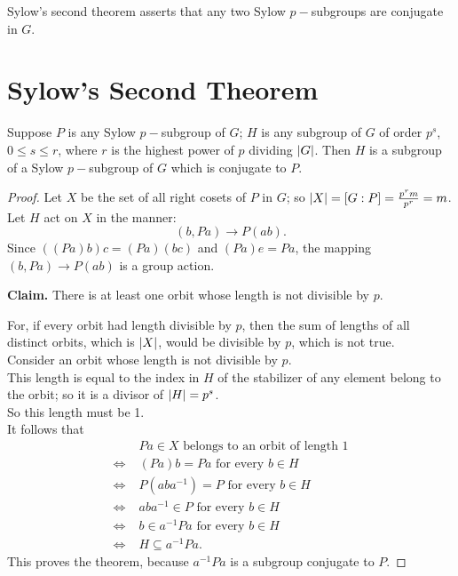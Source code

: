 \documentclass[../main-sheet.tex]{subfiles}
\begin{document}
Sylow's second theorem asserts that any two Sylow \(p-\)subgroups are conjugate in \(G\).
\section{Sylow's Second Theorem}
\begin{thm}
    Suppose \(P\) is any Sylow \(p-\)subgroup of \(G\); \(H\) is any subgroup of \(G\) of order \(p^s\), \(0\leq s\leq r\), where \(r\) is the highest power of \(p\) dividing \(\left\vert G\right\vert\). Then \(H\) is a subgroup of a Sylow \(p-\)subgroup of \(G\) which is conjugate to \(P\).\label{thm:10.5}
\end{thm}
\begin{proof}
    Let \(X\) be the set of all right cosets of \(P\) in \(G \);
    so \(\left\vert X\right\vert = [G: P] = \frac{p^r m}{p^r}= m\).\\
    Let \(H\) act on \(X\) in the manner:
    \[(b, Pa) \to P(ab).\]
    Since \(((Pa)b)c = (Pa)(bc)\) and \((Pa)e = Pa\),
    the mapping \((b, Pa) \to P(ab)\) is a group action.


    \textbf{Claim.} There is at least one orbit whose length is not divisible by \(p\).


    For, if every orbit had length divisible by \(p\), then the sum of lengths of all distinct
    orbits, which is \(\left\vert X\right\vert\), would be divisible by \(p\), which is not true.\\
        Consider an orbit whose length is not divisible by \(p\).\\
        This length is equal to the index in \(H\) of the stabilizer of any element belong to the
        orbit; so it is a divisor of \(\left\vert H\right\vert = p^s\).\\
        So this length must be 1.\\
        It follows that
        \begin{align*}
            & Pa \in X \text{ belongs to an orbit of length } 1\\
            \Leftrightarrow\;& (Pa) b = Pa \text{ for every }b\in H\\
            \Leftrightarrow\;& P(aba^{-1}) = P \text{ for every } b\in H\\
            \Leftrightarrow\;& aba^{-1} \in P \text{ for every } b \in H\\
            \Leftrightarrow\;& b \in a^{-1}Pa \text{ for every } b \in H\\
            \Leftrightarrow\;& H\subseteq a^{-1} Pa.
        \end{align*}
        This proves the theorem, because \(a^{-1} Pa\) is
        a subgroup conjugate to \(P\).
\end{proof}
\end{document}
